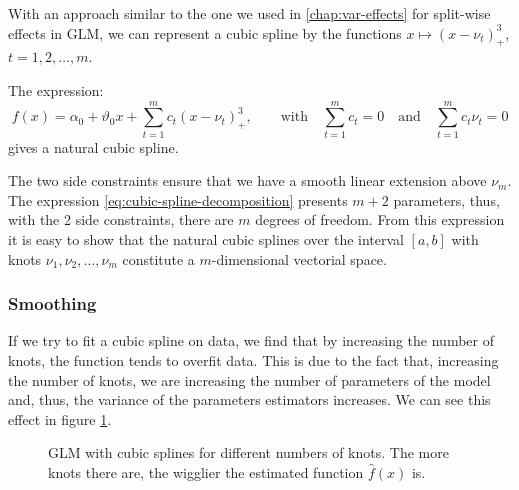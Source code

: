 \documentclass[a4paper, nobind]{templates/ociamthesis}
\theoremstyle{definition}
\theoremstyle{definition}
\theoremstyle{definition}
\theoremstyle{remark}
\begin{document}
With an approach similar to the one we used in \ref{chap:var-effects} for split-wise effects in GLM, we can represent a cubic spline by the functions \(x \mapsto \left( x-\nu_t \right)_+^3\), \(t=1,2,\dots,m\).

The expression:
\begin{equation}
\label{eq:cubic-spline-decomposition}
f(x) = \alpha_0 + \vartheta_0 x + \sum_{t=1}^{m}{c_t \left( x-\nu_t \right)_+^3}, \qquad \text{with} \quad \sum_{t=1}^{m}{c_t} = 0 \quad \text{and} \quad \sum_{t=1}^{m}{c_t\nu_t} = 0
\end{equation}
gives a natural cubic spline.

The two side constraints ensure that we have a smooth linear extension above \(\nu_m\). The expression \eqref{eq:cubic-spline-decomposition} presents \(m+2\) parameters, thus, with the 2 side constraints, there are \(m\) degrees of freedom. From this expression it is easy to show that the natural cubic splines over the interval \([a,b]\) with knots \(\nu_1, \nu_2, \dots, \nu_m\) constitute a \(m\)-dimensional vectorial space.

\hypertarget{smoothing}{%
\subsubsection{Smoothing}\label{smoothing}}

If we try to fit a cubic spline on data, we find that by increasing the number of knots, the function tends to overfit data. This is due to the fact that, increasing the number of knots, we are increasing the number of parameters of the model and, thus, the variance of the parameters estimators increases. We can see this effect in figure \ref{fig:cub-spline}.







\begin{figure}[!hbtp]

{\centering {}\newline{}

}

\caption[GLM with cubic splines for different numbers of knots.]{GLM with cubic splines for different numbers of knots. The more knots there are, the wigglier the estimated function \(\hat{f}(x)\) is.}\label{fig:cub-spline}
\end{figure}
\end{document}
